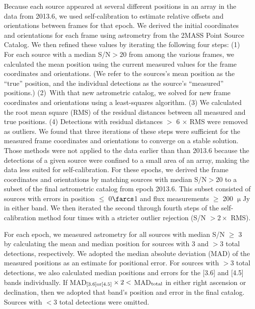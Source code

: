 \documentclass{emulateapj}
\begin{document}
Because each source appeared at several different positions in an array in the data from 2013.6,
we used self-calibration to estimate relative offsets and orientations between frames for that epoch.
We derived the initial coordinates and orientations for each frame using 
astrometry from the 2MASS Point Source Catalog. 
We then refined these values by iterating the following four steps:
(1) For each source with a median S/N$>20$ from among the various frames,
we calculated the mean position using the current measured values for 
the frame coordinates and orientations. 
(We refer to the sources's mean position as the ``true'' position, and the 
individual detections as the source's ``measured'' positions.)
(2)~With that new astrometric catalog,
we solved for new frame coordinates and orientations using a least-squares algorithm.
(3) We calculated the root mean square (RMS)
of the residual distances between all measured and true positions.
(4) Detections with residual distances $>$ 6 $\times$ RMS were removed as outliers.
We found that three iterations of these steps were sufficient for the 
measured frame coordinates and orientations to converge on a stable solution. 
Those methods were not applied to the data earlier than than 2013.6 because 
the detections of a given source were confined to a small area of an array, making 
the data less suited for self-calibration.
For these epochs, 
we derived the frame coordinates and orientations by matching sources with
median S/N$>20$ to a subset of the final astrometric catalog from epoch 2013.6.
This subset consisted of sources with errors in position
$\leq$ 0$\farcs$1 and flux measurements $\geq$ 200 $\upmu$Jy in either band.
We then iterated the second through fourth steps of the self-calibration
method four times with a stricter outlier rejection (S/N $>2\times$ RMS). 

For each epoch, we measured astrometry for all sources with median S/N $\geq$ 3
by calculating the mean and median position for sources with 3 and $>$3
total detections, respectively.
We adopted the median absolute deviation (MAD) of the measured positions 
as an estimate for positional error. For sources with $>$3 total detections,
we also calculated median positions and errors for the [3.6] and [4.5] bands
individually. If MAD$_{\rm [3.6] or [4.5]} \times 2 <$ MAD$_{\rm total}$ in
either right ascension or declination,
then we adopted that band's position and error in the final catalog.
Sources with $<$3 total detections were omitted.
\end{document}
